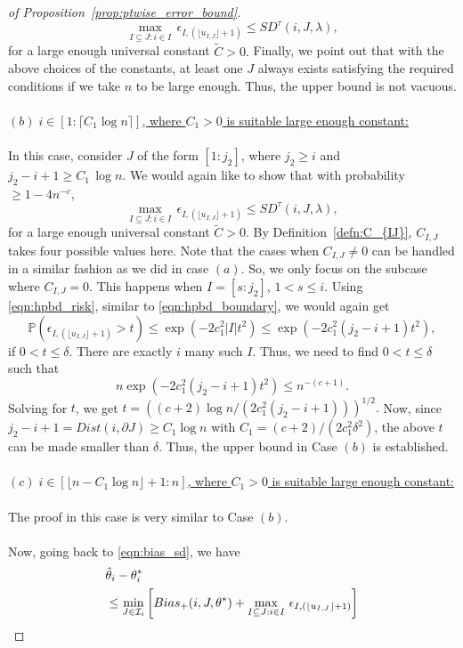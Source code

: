 \documentclass[11pt]{article}
\newcommand{\I}{\mathcal{I}}
\newcommand{\bP}{\mathbb{P}}
\theoremstyle{plain}
\theoremstyle{definition}
\theoremstyle{remark}
\begin{document}
\begin{appendix}
\begin{proof}[of Proposition~\ref{prop:ptwise_error_bound}]
 \[ \max_{I\subseteq J: i \in I}\,\epsilon_{I,(\lfloor u_{I,J}\rfloor+1)}\leq SD^{\tau}(i,J,\lambda),\]
 for a large enough universal constant $\tilde{C}>0.$ Finally, we point out that with the above choices of the constants, at least one $J$ always exists satisfying the required conditions if we take $n$ to be large enough. Thus, the upper bound is not vacuous.
 \\
 \\
\noindent \underline{$(b)\;i\in [1:\lceil C_1 \log n\rceil]$, where $C_1>0$ is suitable large enough constant:}\\
\\
\noindent In this case, consider $J$ of the form $[1:j_2]$, where $j_2\geq i$ and $j_2-i+1\geq C_1\, \log n.$ We would again like to show that with probability $\geq 1-4n^{-c}$, 
\[ \max_{I\subseteq J: i \in I}\,\epsilon_{I,(\lfloor u_{I,J}\rfloor+1)}\leq SD^{\tau}(i,J,\lambda),\]
for a large enough universal constant $\tilde{C}>0.$ By Definition~\ref{defn:C_{IJ}}, \(C_{I,J}\) takes four possible values here. Note that the cases when $C_{I,J}\neq 0$ can be handled in a similar fashion as we did in case $(a)$. So, we only focus on the subcase where $C_{I,J}=0$. This happens when $I=[s:j_2]$, $1<s\leq i .$ Using \eqref{eqn:hpbd_risk}, similar to \eqref{eqn:hpbd_boundary}, we would again get
\[\bP\left(\epsilon_{I,(\lfloor u_{I,J}\rfloor+1)}>t\right)\leq  \exp{\left(-2c_1^2|I|t^2\right)}\leq  \exp{\left(-2c_1^2(j_2-i+1)t^2\right)},\]
if $0<t\leq \delta.$  There are exactly $i$ many such $I$. Thus, we need to find $0<t\leq \delta$ such that
\[n\exp{\left(-2c_1^2(j_2-i+1) t^2\right)}\leq n^{-(c+1)}.\]
Solving for $t$, we get $t= \left((c+2)\log n/(2c_1^2(j_2-i+1))\right)^{1/2}.$
Now, since $j_2-i+1=Dist(i,\partial J)\geq C_1 \log n$ with $C_1=(c+2)/(2c_1^2\delta^2)$, the above $t$ can be made smaller than $\delta$. Thus, the upper bound in Case $(b)$ is established.\\
 \\
\noindent \underline{$(c)\;i\in [\lfloor n-C_1 \log n\rfloor+1:n]$, where $C_1>0$ is suitable large enough constant:}\\
\\
\noindent The proof in this case is very similar to Case $(b)$.\\
\\
\noindent Now, going back to \eqref{eqn:bias_sd}, we have
\begin{align*}
    &\hat{\theta}_i-\theta^*_i\\
    &\leq  \min_{J \in \I_i}\left[Bias_+(i,J,\theta^*)+\max_{I\subseteq J: i \in I}\,\epsilon_{I,(\lfloor u_{I,J}\rfloor+1)}\right]\allowdisplaybreaks\\

\end{align*}
\end{proof}
\end{appendix}
\end{document}
